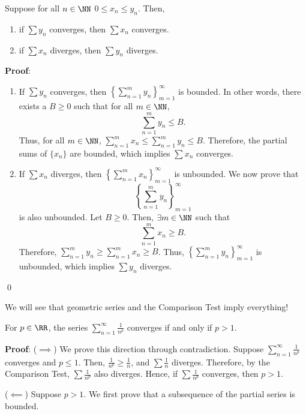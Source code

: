 \begin{theorem}
Suppose for all $n\in \NN$ $0\leq x_n \leq y_n$. Then,
\begin{enumerate}
\item if $\sum y_n$ converges, then $\sum x_n$ converges. 
\item if $\sum x_n$ diverges, then $\sum y_n$ diverges.
\end{enumerate}
\end{theorem}
\textbf{Proof}:
\begin{enumerate}
    \item If $\sum y_n$ converges, then $\left\{\sum_{n=1}^m y_n\right\}_{m=1}^\infty$ is bounded. In other words, there exists a $B\geq 0$ such that for all $m\in \NN$,
    \[
    \sum_{n=1}^m y_n \leq B.
    \]
    Thus, for all $m\in \NN$, $\sum_{n=1}^m x_n \leq \sum_{n=1}^m y_n \leq B$. Therefore, the partial sums of $\{x_n\}$ are bounded, which implies $\sum x_n$ converges.
    \item If $\sum x_n$ diverges, then $\left\{\sum_{n=1}^m x_n\right\}_{m=1}^\infty$ is unbounded. We now prove that \[\left\{\sum_{n=1}^m y_n\right\}_{m=1}^\infty\] is also unbounded. Let $B\geq 0$. Then, $\exists m\in \NN$ such that 
    \[
    \sum_{n=1}^m x_n \geq B.
    \]
    Therefore, $\sum_{n=1}^m y_n \geq \sum_{n=1}^m x_n \geq B$. Thus, $\left\{\sum_{n=1}^m y_n\right\}_{m=1}^\infty$ is unbounded, which implies $\sum y_n$ diverges.
\end{enumerate}
\qed 

\begin{remark}
We will see that geometric series and the Comparison Test imply everything!
\end{remark}

\begin{theorem}
For $p\in \RR$, the series $\sum_{n=1}^\infty \frac{1}{n^p}$ converges if and only if $p>1$.
\end{theorem}
\textbf{Proof}: ($\implies$) We prove this direction through contradiction. Suppose $\sum_{n=1}^\infty \frac{1}{n^p}$ converges and $p\leq 1$. Then, $\frac{1}{n^p} \geq \frac{1}{n}$, and $\sum \frac{1}{n}$ diverges. Therefore, by the Comparison Test, $\sum \frac{1}{n^p}$ also diverges. Hence, if $\sum \frac{1}{n^p}$ converges, then $p>1$.

($\impliedby$) Suppose $p>1$. We first prove that a subsequence of the partial series is bounded. 

